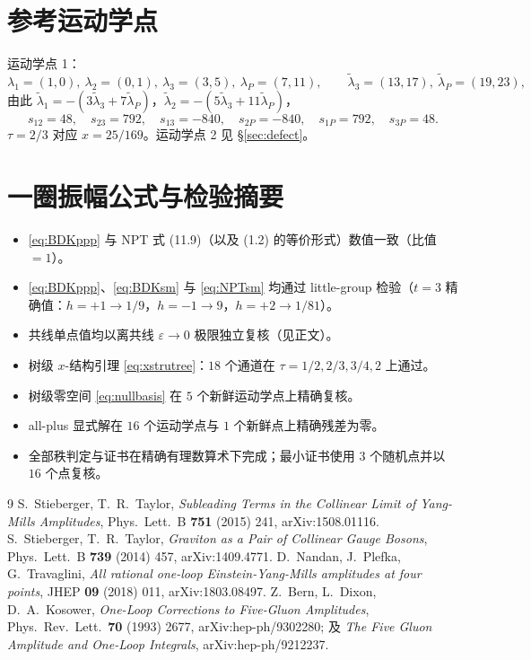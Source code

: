 \documentclass[11pt]{article}
\newcommand{\Pt}{P}
\begin{document}
\appendix
\section{参考运动学点}
\label{sec:ref}
运动学点 1：
\begin{equation}
\lambda_1=(1,0),\ \lambda_2=(0,1),\ \lambda_3=(3,5),\ \lambda_\Pt=(7,11),\qquad
\widetilde\lambda_3=(13,17),\ \widetilde\lambda_\Pt=(19,23),
\end{equation}
由此 $\widetilde\lambda_1=-(3\widetilde\lambda_3+7\widetilde\lambda_\Pt)$，$\widetilde\lambda_2=-(5\widetilde\lambda_3+11\widetilde\lambda_\Pt)$，
\[
s_{12}=48,\quad s_{23}=792,\quad s_{13}=-840,\quad s_{2\Pt}=-840,\quad s_{1\Pt}=792,\quad s_{3\Pt}=48 .
\]
$\tau=2/3$ 对应 $x=25/169$。运动学点 2 见 \S\ref{sec:defect}。

\section{一圈振幅公式与检验摘要}
\begin{itemize}
\item \eqref{eq:BDKppp} 与 NPT \cite{NPT2018} 式 (11.9)（以及 (1.2) 的等价形式）数值一致（比值 $=1$）。
\item \eqref{eq:BDKppp}、\eqref{eq:BDKsm} 与 \eqref{eq:NPTsm} 均通过 little-group 检验（$t=3$ 精确值：$h=+1\to1/9$，$h=-1\to9$，$h=+2\to1/81$）。
\item 共线单点值均以离共线 $\varepsilon\to0$ 极限独立复核（见正文）。
\item 树级 $x$-结构引理 \eqref{eq:xstrutree}：$18$ 个通道在 $\tau=1/2,2/3,3/4,2$ 上通过。
\item 树级零空间 \eqref{eq:nullbasis} 在 $5$ 个新鲜运动学点上精确复核。
\item all-plus 显式解在 $16$ 个运动学点与 $1$ 个新鲜点上精确残差为零。
\item 全部秩判定与证书在精确有理数算术下完成；最小证书使用 $3$ 个随机点并以 $16$ 个点复核。
\end{itemize}

\begin{thebibliography}{9}
 S.~Stieberger, T.~R.~Taylor, \emph{Subleading Terms in the Collinear Limit of Yang-Mills Amplitudes}, Phys.\ Lett.\ B {\bf 751} (2015) 241, arXiv:1508.01116.
 S.~Stieberger, T.~R.~Taylor, \emph{Graviton as a Pair of Collinear Gauge Bosons}, Phys.\ Lett.\ B {\bf 739} (2014) 457, arXiv:1409.4771.
 D.~Nandan, J.~Plefka, G.~Travaglini, \emph{All rational one-loop Einstein-Yang-Mills amplitudes at four points}, JHEP {\bf 09} (2018) 011, arXiv:1803.08497.
 Z.~Bern, L.~Dixon, D.~A.~Kosower, \emph{One-Loop Corrections to Five-Gluon Amplitudes}, Phys.\ Rev.\ Lett.\ {\bf 70} (1993) 2677, arXiv:hep-ph/9302280; 及 \emph{The Five Gluon Amplitude and One-Loop Integrals}, arXiv:hep-ph/9212237.
\end{thebibliography}
\end{document}
